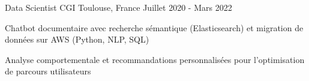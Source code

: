 \begin{cventries}

\cventry
{Data Scientist} %
{CGI} %
{Toulouse, France} %
{Juillet 2020 - Mars 2022} %
{ %
\begin{cvitems}
\item {Chatbot documentaire avec recherche sémantique (Elasticsearch) et migration de données sur AWS (Python, NLP, SQL)}
\item {Analyse comportementale et recommandations personnalisées pour l'optimisation de parcours utilisateurs}
\end{cvitems}
}


\end{cventries}
